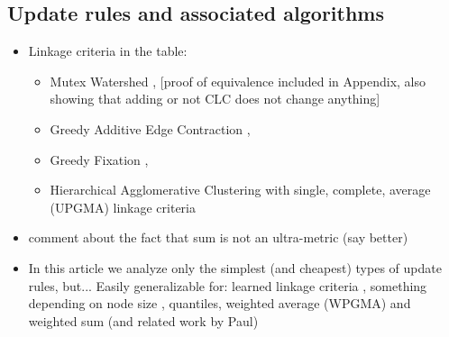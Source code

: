 \subsection{Update rules and associated algorithms}
\begin{itemize}
\item Linkage criteria in the table:
\begin{itemize}
\item Mutex Watershed \cite{wolf2018mutex}, [proof of equivalence included in Appendix, also showing that adding or not CLC does not change anything]
\item Greedy Additive Edge Contraction \cite{levinkov2017comparative}, 
\item Greedy Fixation \cite{levinkov2017comparative}, 
\item Hierarchical Agglomerative Clustering with single, complete, average (UPGMA) linkage criteria
\end{itemize}
\item comment about the fact that sum is not an ultra-metric (say better)
\item In this article we analyze only the simplest (and cheapest) types of update rules, but... Easily generalizable for: learned linkage criteria \cite{nunez2013machine}, something depending on node size \cite{felzenszwalb2004efficient}, quantiles, weighted average (WPGMA) and weighted sum (and related work by Paul)



            


\end{itemize}
